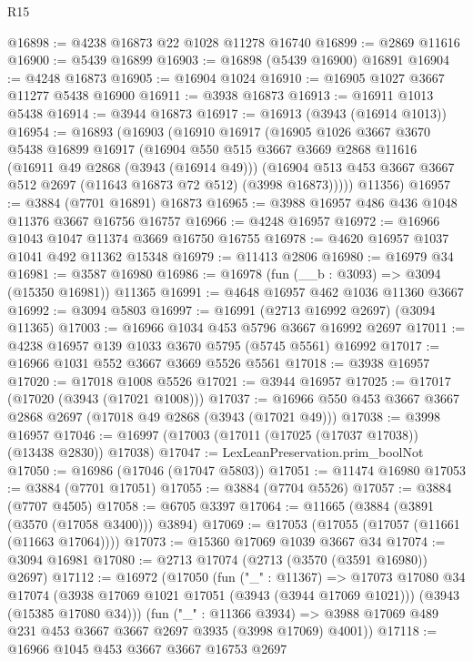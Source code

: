 \begin{lexlean}{R15}
\begin{coremodule}
@16898 := @4238 @16873 @22 @1028 @11278 @16740
@16899 := @2869 @11616
@16900 := @5439 @16899
@16903 := @16898 (@5439 @16900) @16891
@16904 := @4248 @16873
@16905 := @16904 @1024
@16910 := @16905 @1027 @3667 @11277 @5438 @16900
@16911 := @3938 @16873
@16913 := @16911 @1013 @5438
@16914 := @3944 @16873
@16917 := @16913 (@3943 (@16914 @1013))
@16954 := @16893
    (@16903
      (@16910
        @16917
        (@16905
          @1026
          @3667
          @3670
          @5438
          @16899
          @16917
          (@16904
            @550
            @515
            @3667
            @3669
            @2868
            @11616
            (@16911 @49 @2868 (@3943 (@16914 @49)))
            (@16904 @513 @453 @3667 @3667 @512 @2697 (@11643 @16873 @72 @512) (@3998 @16873)))))
      @11356)
@16957 := @3884 (@7701 @16891) @16873
@16965 := @3988 @16957 @486 @436 @1048 @11376 @3667 @16756 @16757
@16966 := @4248 @16957
@16972 := @16966 @1043 @1047 @11374 @3669 @16750 @16755
@16978 := @4620 @16957 @1037 @1041 @492 @11362 @15348
@16979 := @11413 @2806
@16980 := @16979 @34
@16981 := @3587 @16980
@16986 := @16978 (fun (__b : @3093) => @3094 (@15350 @16981)) @11365
@16991 := @4648 @16957 @462 @1036 @11360 @3667
@16992 := @3094 @5803
@16997 := @16991 (@2713 @16992 @2697) (@3094 @11365)
@17003 := @16966 @1034 @453 @5796 @3667 @16992 @2697
@17011 := @4238 @16957 @139 @1033 @3670 @5795 (@5745 @5561) @16992
@17017 := @16966 @1031 @552 @3667 @3669 @5526 @5561
@17018 := @3938 @16957
@17020 := @17018 @1008 @5526
@17021 := @3944 @16957
@17025 := @17017 (@17020 (@3943 (@17021 @1008)))
@17037 := @16966 @550 @453 @3667 @3667 @2868 @2697 (@17018 @49 @2868 (@3943 (@17021 @49)))
@17038 := @3998 @16957
@17046 := @16997 (@17003 (@17011 (@17025 (@17037 @17038)) (@13438 @2830)) @17038)
@17047 := LexLeanPreservation.prim_boolNot
@17050 := @16986 (@17046 (@17047 @5803))
@17051 := @11474 @16980
@17053 := @3884 (@7701 @17051)
@17055 := @3884 (@7704 @5526)
@17057 := @3884 (@7707 @4505)
@17058 := @6705 @3397
@17064 := @11665 (@3884 (@3891 (@3570 (@17058 @3400))) @3894)
@17069 := @17053 (@17055 (@17057 (@11661 (@11663 @17064))))
@17073 := @15360 @17069 @1039 @3667 @34
@17074 := @3094 @16981
@17080 := @2713 @17074 (@2713 (@3570 (@3591 @16980)) @2697)
@17112 := @16972
    (@17050
      (fun ("_" : @11367) =>
      @17073
        @17080
        @34
        @17074
        (@3938 @17069 @1021 @17051 (@3943 (@3944 @17069 @1021)))
        (@3943 (@15385 @17080 @34)))
      (fun ("_" : @11366 @3934) =>
      @3988 @17069 @489 @231 @453 @3667 @3667 @2697 @3935 (@3998 @17069) @4001))
@17118 := @16966 @1045 @453 @3667 @3667 @16753 @2697

\end{coremodule}
\end{lexlean}
